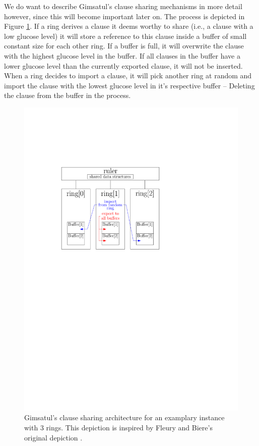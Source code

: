 \documentclass[12pt,a4paper,twoside]{scrartcl}
\numberwithin{equation}{section}
\begin{document}
We do want to describe Gimsatul's clause sharing mechanisms in more detail however, since this will become important later on. The process is depicted in Figure \ref{fig:architectureGimsatul}. If a ring derives a clause it deems worthy to share (i.e., a clause with a low glucose level) it will store a reference to this clause inside a buffer of small constant size for each other ring. If a buffer is full, it will overwrite the clause with the highest glucose level in the buffer. If all clauses in the buffer have a lower glucose level than the currently exported clause, it will not be inserted. When a ring decides to import a clause, it will pick another ring at random and import the clause with the lowest glucose level in it's respective buffer -- Deleting the clause from the buffer in the process.

\begin{figure}[!h]
  \center
  \includegraphics[]{figures/gimsatul_architecture.pdf}
  \caption{Gimsatul's clause sharing architecture for an examplary instance with 3 rings. This depiction is inspired by Fleury and Biere's original depiction \cite{gimsatul}.}
  \label{fig:architectureGimsatul}
\end{figure}
\end{document}
